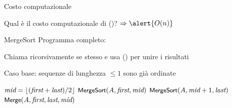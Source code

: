 \begin{frame}{Costo computazionale}

\vspace{-9pt}
\begin{myboxtitle}[Domanda]
	Qual è il costo computazionale di \Merge()? \pause $\Rightarrow \alert{O(n)}$
\end{myboxtitle}

\end{frame}

\begin{frame}{MergeSort}
Programma completo:
\BI
\item Chiama ricorsivamente se stesso e usa \Merge() per unire i risultati
\item Caso base: sequenze di lunghezza $\leq 1$ sono già ordinate
\EI	
\bigskip
\begin{Procedure}
\caption[A]{\Mergesort($\Item\ A[\ ]$, \INTEGER \Primo, \INTEGER \Ultimo)}

  \If{$\Primo < \Ultimo$}
  {
    \INTEGER $\textit{mid} = \lfloor(\textit{first} + \textit{last}) / 2\rfloor$ \;
	$\textsf{{\small MergeSort}}(A, \textit{first}, \textit{mid})$ \;
	$\textsf{{\small MergeSort}}(A, \textit{mid} + 1, \textit{last})$ \;
	$\textsf{{\small Merge}}(A, \textit{first}, \textit{last}, \textit{mid})$ \;
  }	
\end{Procedure}

\end{frame}

